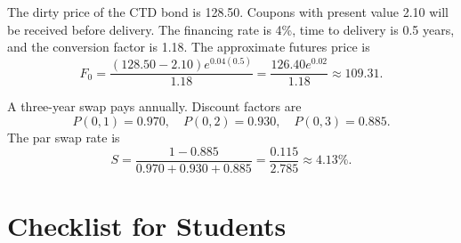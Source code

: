 \begin{exmp}
The dirty price of the CTD bond is 128.50. Coupons with present value 2.10 will
be received before delivery. The financing rate is 4\%, time to delivery is
0.5 years, and the conversion factor is 1.18. The approximate futures price is
\[
    F_0=\frac{(128.50-2.10)e^{0.04(0.5)}}{1.18}
    =
    \frac{126.40e^{0.02}}{1.18}
    \approx 109.31.
\]
\end{exmp}

\begin{exmp}
A three-year swap pays annually. Discount factors are
\[
    P(0,1)=0.970,\quad P(0,2)=0.930,\quad P(0,3)=0.885.
\]
The par swap rate is
\[
    S=\frac{1-0.885}{0.970+0.930+0.885}
    =
    \frac{0.115}{2.785}
    \approx 4.13\%.
\]
\end{exmp}

\section{Checklist for Students}

